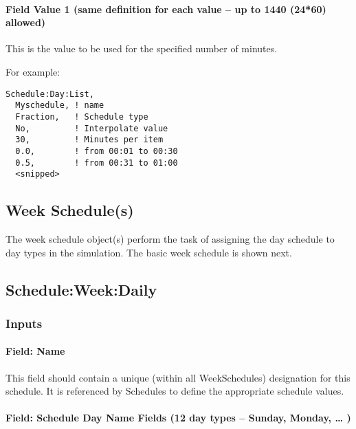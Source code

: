 \paragraph{Field Value 1 (same definition for each value -- up to 1440 (24*60) allowed)}\label{field-value-1-same-definition-for-each-value-up-to-1440-2460-allowed}

This is the value to be used for the specified number of minutes.

For example:

\begin{lstlisting}
Schedule:Day:List,
  Myschedule, ! name
  Fraction,   ! Schedule type
  No,         ! Interpolate value
  30,         ! Minutes per item
  0.0,        ! from 00:01 to 00:30
  0.5,        ! from 00:31 to 01:00
  <snipped>
\end{lstlisting}

\subsection{Week Schedule(s)}\label{week-schedules}

The week schedule object(s) perform the task of assigning the day schedule to day types in the simulation. The basic week schedule is shown next.

\subsection{Schedule:Week:Daily}\label{scheduleweekdaily}

\subsubsection{Inputs}\label{inputs-4-029}

\paragraph{Field: Name}\label{field-name-4-025}

This field should contain a unique (within all WeekSchedules) designation for this schedule. It is referenced by Schedules to define the appropriate schedule values.

\paragraph{Field: Schedule Day Name Fields (12 day types -- Sunday, Monday, \ldots{} )}\label{field-schedule-day-name-fields-12-day-types-sunday-monday}


